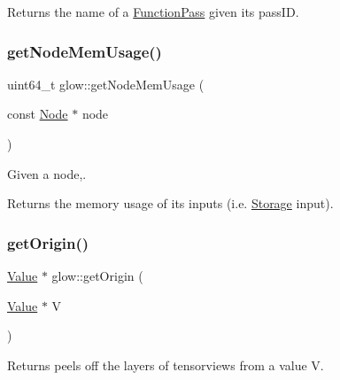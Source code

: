 \begin{DoxyReturn}{Returns}
the name of a \hyperlink{classglow_1_1_function_pass}{Function\+Pass} given its {\ttfamily pass\+ID}. 
\end{DoxyReturn}
\mbox{\label{namespaceglow_a59d8826ffac432ffcebc8dcd11a85816}} 
\subsubsection{\texorpdfstring{get\+Node\+Mem\+Usage()}{getNodeMemUsage()}}
{\footnotesize\ttfamily uint64\+\_\+t glow\+::get\+Node\+Mem\+Usage (\begin{DoxyParamCaption}\item[{const \hyperlink{classglow_1_1_node}{Node} $\ast$}]{node }\end{DoxyParamCaption})}



Given a node,. 

\begin{DoxyReturn}{Returns}
the memory usage of its inputs (i.\+e. \hyperlink{classglow_1_1_storage}{Storage} input). 
\end{DoxyReturn}
\mbox{\label{namespaceglow_a455ad0b5511a75c369f14b06c1de37fd}} 
\subsubsection{\texorpdfstring{get\+Origin()}{getOrigin()}\hspace{0.1cm}{\footnotesize\ttfamily [1/2]}}
{\footnotesize\ttfamily \hyperlink{classglow_1_1_value}{Value} $\ast$ glow\+::get\+Origin (\begin{DoxyParamCaption}\item[{\hyperlink{classglow_1_1_value}{Value} $\ast$}]{V }\end{DoxyParamCaption})}

\begin{DoxyReturn}{Returns}
peels off the layers of tensorviews from a value {\ttfamily V}. 
\end{DoxyReturn}
\mbox{\label{namespaceglow_a582b647d0167e2bd46758cf24a691ac3}} 
